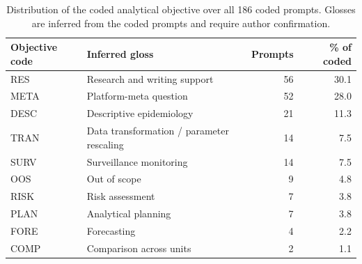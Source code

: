 \begin{table}[htbp]
\centering
\caption{Distribution of the coded analytical objective over all 186 coded prompts. Glosses are inferred from the coded prompts and require author confirmation.}
\label{tab:s5-objectives}
\begin{tabular}{llrr}
\toprule
Objective code & Inferred gloss & Prompts & \% of coded \\
\midrule
RES & Research and writing support & 56 & 30.1 \\
META & Platform-meta question & 52 & 28.0 \\
DESC & Descriptive epidemiology & 21 & 11.3 \\
TRAN & Data transformation / parameter rescaling & 14 & 7.5 \\
SURV & Surveillance monitoring & 14 & 7.5 \\
OOS & Out of scope & 9 & 4.8 \\
RISK & Risk assessment & 7 & 3.8 \\
PLAN & Analytical planning & 7 & 3.8 \\
FORE & Forecasting & 4 & 2.2 \\
COMP & Comparison across units & 2 & 1.1 \\
\bottomrule
\end{tabular}
\par{}
\end{table}
